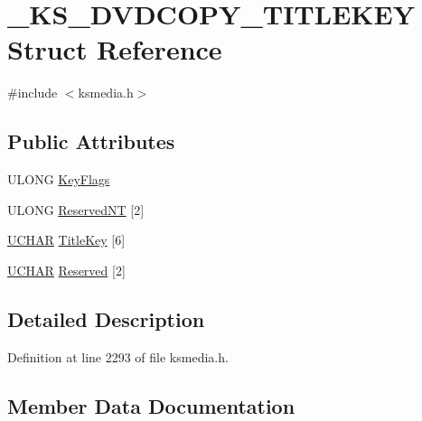 \hypertarget{struct___k_s___d_v_d_c_o_p_y___t_i_t_l_e_k_e_y}{}\section{\+\_\+\+K\+S\+\_\+\+D\+V\+D\+C\+O\+P\+Y\+\_\+\+T\+I\+T\+L\+E\+K\+EY Struct Reference}
\label{struct___k_s___d_v_d_c_o_p_y___t_i_t_l_e_k_e_y}


{\ttfamily \#include $<$ksmedia.\+h$>$}

\subsection*{Public Attributes}
\begin{DoxyCompactItemize}
\item 
U\+L\+O\+NG \hyperlink{struct___k_s___d_v_d_c_o_p_y___t_i_t_l_e_k_e_y_a67c5ab03de815bfdb8a590206126bce4}{Key\+Flags}
\item 
U\+L\+O\+NG \hyperlink{struct___k_s___d_v_d_c_o_p_y___t_i_t_l_e_k_e_y_a5faf97e025ce841b170ddce40586e27c}{Reserved\+NT} \mbox{[}2\mbox{]}
\item 
\hyperlink{xlisp_8h_a9a1dc6d243c6f75bb42f87e3f69649e4}{U\+C\+H\+AR} \hyperlink{struct___k_s___d_v_d_c_o_p_y___t_i_t_l_e_k_e_y_a8beb789335f9d42c9e8914de5ce4b9c0}{Title\+Key} \mbox{[}6\mbox{]}
\item 
\hyperlink{xlisp_8h_a9a1dc6d243c6f75bb42f87e3f69649e4}{U\+C\+H\+AR} \hyperlink{struct___k_s___d_v_d_c_o_p_y___t_i_t_l_e_k_e_y_a2f03fc09f32b0884effcbfd5266d22e4}{Reserved} \mbox{[}2\mbox{]}
\end{DoxyCompactItemize}


\subsection{Detailed Description}


Definition at line 2293 of file ksmedia.\+h.



\subsection{Member Data Documentation}
